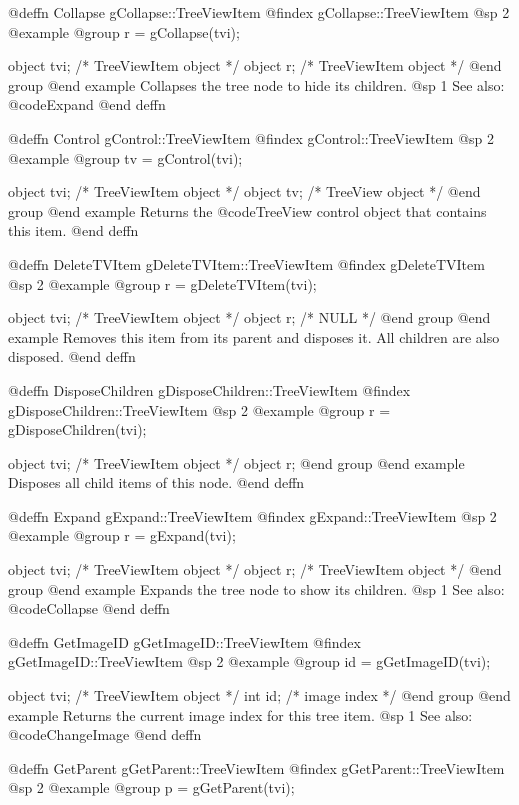 @deffn {Collapse} gCollapse::TreeViewItem
@findex gCollapse::TreeViewItem
@sp 2
@example
@group
r = gCollapse(tvi);

object  tvi;   /*  TreeViewItem object  */
object  r;     /*  TreeViewItem object  */
@end group
@end example
Collapses the tree node to hide its children.
@sp 1
See also:  @code{Expand}
@end deffn



@deffn {Control} gControl::TreeViewItem
@findex gControl::TreeViewItem
@sp 2
@example
@group
tv = gControl(tvi);

object  tvi;   /*  TreeViewItem object  */
object  tv;    /*  TreeView object      */
@end group
@end example
Returns the @code{TreeView} control object that contains this item.
@end deffn



@deffn {DeleteTVItem} gDeleteTVItem::TreeViewItem
@findex gDeleteTVItem
@sp 2
@example
@group
r = gDeleteTVItem(tvi);

object  tvi;   /*  TreeViewItem object  */
object  r;     /*  NULL                 */
@end group
@end example
Removes this item from its parent and disposes it.  All children are
also disposed.
@end deffn



@deffn {DisposeChildren} gDisposeChildren::TreeViewItem
@findex gDisposeChildren::TreeViewItem
@sp 2
@example
@group
r = gDisposeChildren(tvi);

object  tvi;   /*  TreeViewItem object  */
object  r;
@end group
@end example
Disposes all child items of this node.
@end deffn



@deffn {Expand} gExpand::TreeViewItem
@findex gExpand::TreeViewItem
@sp 2
@example
@group
r = gExpand(tvi);

object  tvi;   /*  TreeViewItem object  */
object  r;     /*  TreeViewItem object  */
@end group
@end example
Expands the tree node to show its children.
@sp 1
See also:  @code{Collapse}
@end deffn



@deffn {GetImageID} gGetImageID::TreeViewItem
@findex gGetImageID::TreeViewItem
@sp 2
@example
@group
id = gGetImageID(tvi);

object  tvi;   /*  TreeViewItem object  */
int     id;    /*  image index          */
@end group
@end example
Returns the current image index for this tree item.
@sp 1
See also:  @code{ChangeImage}
@end deffn



@deffn {GetParent} gGetParent::TreeViewItem
@findex gGetParent::TreeViewItem
@sp 2
@example
@group
p = gGetParent(tvi);

